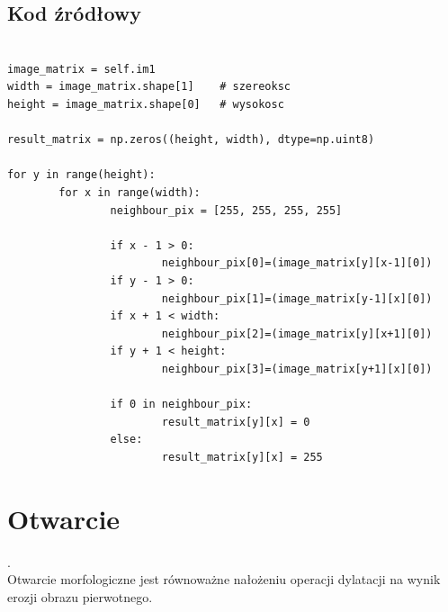 \documentclass[final,a4paper,openany,12pt]{mwbk}
\begin{document}
\subsection*{Kod źródłowy}

\begin{lstlisting}[caption= Operacja nakładania (dylatacji) na obrazie binarnym]

image_matrix = self.im1
width = image_matrix.shape[1]    # szereoksc
height = image_matrix.shape[0]   # wysokosc

result_matrix = np.zeros((height, width), dtype=np.uint8)

for y in range(height):
        for x in range(width):  
                neighbour_pix = [255, 255, 255, 255]

                if x - 1 > 0:
                        neighbour_pix[0]=(image_matrix[y][x-1][0])
                if y - 1 > 0:
                        neighbour_pix[1]=(image_matrix[y-1][x][0])
                if x + 1 < width:
                        neighbour_pix[2]=(image_matrix[y][x+1][0])
                if y + 1 < height:
                        neighbour_pix[3]=(image_matrix[y+1][x][0])

                if 0 in neighbour_pix:
                        result_matrix[y][x] = 0
                else:
                        result_matrix[y][x] = 255          

\end{lstlisting}
\newpage

\section{ Otwarcie}
.\hfill\\
\indent
	Otwarcie morfologiczne jest równoważne nałożeniu operacji dylatacji na wynik erozji obrazu pierwotnego.
\end{document}
